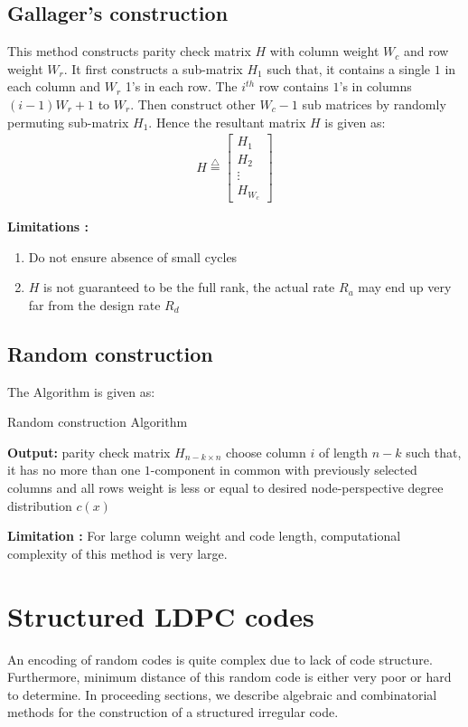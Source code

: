 \subsection{Gallager's construction}
This method\cite{Mackay} constructs parity check matrix $H$ with column weight $W_c$ and row weight $W_r$. It first constructs a sub-matrix $H_1$ such that, it contains a single $1$ in each column and $W_r$ 1's in each row. The $i^{th}$ row contains $1$'s in columns $(i-1)W_r + 1$ to $W_r$. Then construct other $W_c-1$ sub matrices by randomly permuting sub-matrix $H_1$. Hence the resultant matrix $H$ is given as:
\begin{align}
 H \overset{\triangle}{=}  \begin{bmatrix}
H_1\\
H_2\\
\vdots\\
H_{W_c}\end{bmatrix} \nonumber
\end{align}

\textbf{Limitations :}
\begin{enumerate}
 \item Do not ensure absence of small cycles
 \item $H$ is not guaranteed to be the full rank, the actual rate $R_a$ may end up very far from the design rate $R_d$
\end{enumerate}

\subsection{Random construction}
The Algorithm is given as:

\begin{algorithm}[H]
\caption{Random construction Algorithm}
\label{rand}
\begin{algorithmic}
\STATE \textbf{Output:} parity check matrix $H_{n-k \times n}$
\STATE choose column $i$ of length $n-k$ such that, it has no more than one $1$-component in common with previously selected columns and all rows weight is less or equal to desired node-perspective degree distribution $c(x)$
\ENDFOR
\end{algorithmic}
\end{algorithm}

\textbf{Limitation :}
For large column weight and code length, computational complexity of this method is very large.

\section{Structured LDPC codes}
An encoding of random codes is quite complex due to lack of code structure. Furthermore, minimum distance of this random code is either very poor or hard to determine\cite{kou}. In proceeding sections, we describe algebraic and combinatorial methods for the construction of a structured irregular code.

